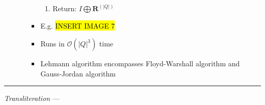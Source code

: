 \begin{itemize}
\begin{itemize}
\begin{itemize}
\begin{enumerate}
                \item Return:
                $
                I \bigoplus \boldsymbol{R}^{(|Q|)}
                $
            \end{enumerate}
            \item E.g.
            \hl{INSERT IMAGE 7}
            \item Runs in $\mathcal{O}(|Q|^3)$ time
            \item Lehmann algorithm encompasses Floyd-Warshall algorithm and Gauss-Jordan algorithm
        \end{itemize}
    \end{itemize}
\end{itemize}

{\color{lightgrey}\hrule height 0.001mm}

\emph{Transliteration} ---
